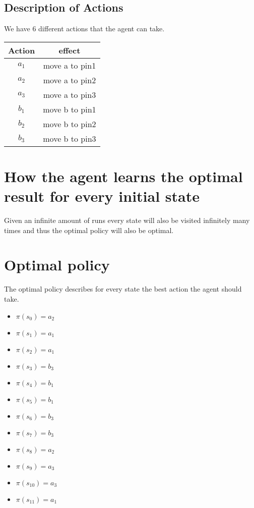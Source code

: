 \documentclass[a4paper]{article}
\begin{document}
\newpage
\subsection{Description of Actions}
We have 6 different actions that the agent can take. \\

\begin{tabular}{c|c}
Action & effect \\
\hline
$a_{1}$ & move a to pin1 \\
$a_{2}$ & move a to pin2 \\
$a_{3}$ & move a to pin3 \\
$b_{1}$ & move b to pin1 \\
$b_{2}$ & move b to pin2 \\
$b_{3}$ & move b to pin3
\end{tabular}

\section{How the agent learns the optimal result for every initial state}
Given an infinite amount of runs every state will also be visited infinitely many times and thus the optimal policy will also be optimal. 

\section{Optimal policy}
The optimal policy describes for every state the best action the agent should take.

\begin{multicols}{2}
\begin{itemize}
\item $\pi(s_{0}) = a_{2}$
\item $\pi(s_{1}) = a_{1}$
\item $\pi(s_{2}) = a_{1}$
\item $\pi(s_{3}) = b_{3}$
\item $\pi(s_{4}) = b_{1}$
\item $\pi(s_{5}) = b_{1}$
\item $\pi(s_{6}) = b_{3}$
\item $\pi(s_{7}) = b_{3}$
\item $\pi(s_{8}) = a_{2}$
\item $\pi(s_{9}) = a_{3}$
\item $\pi(s_{10}) = a_{3}$
\item $\pi(s_{11}) = a_{1}$
\end{itemize}
\end{multicols}
\end{document}
